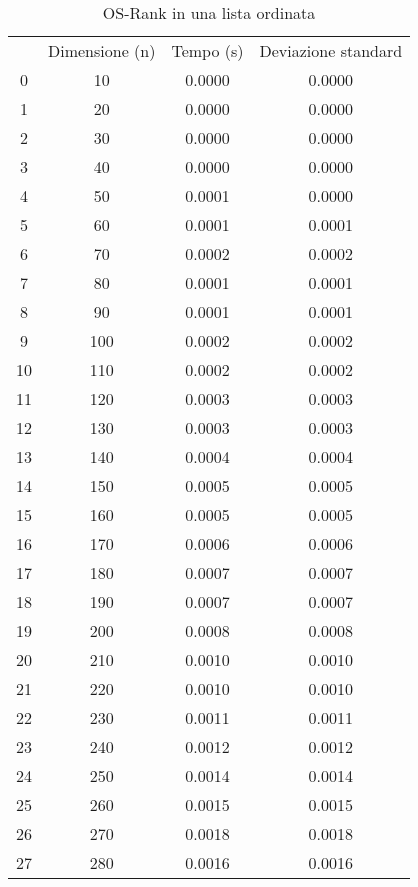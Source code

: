 \begin{table}
\centering
\caption{OS-Rank in una lista ordinata}
\label{OS-Rank in una lista ordinata}
\begin{adjustbox}{width=1\textwidth/2}
\begin{tabular}{|c|c|c|c|}
\hline
 & Dimensione (n) & Tempo (s) & Deviazione standard \\
0 & 10 & 0.0000 & 0.0000 \\
\cline{1-4}
1 & 20 & 0.0000 & 0.0000 \\
\cline{1-4}
2 & 30 & 0.0000 & 0.0000 \\
\cline{1-4}
3 & 40 & 0.0000 & 0.0000 \\
\cline{1-4}
4 & 50 & 0.0001 & 0.0000 \\
\cline{1-4}
5 & 60 & 0.0001 & 0.0001 \\
\cline{1-4}
6 & 70 & 0.0002 & 0.0002 \\
\cline{1-4}
7 & 80 & 0.0001 & 0.0001 \\
\cline{1-4}
8 & 90 & 0.0001 & 0.0001 \\
\cline{1-4}
9 & 100 & 0.0002 & 0.0002 \\
\cline{1-4}
10 & 110 & 0.0002 & 0.0002 \\
\cline{1-4}
11 & 120 & 0.0003 & 0.0003 \\
\cline{1-4}
12 & 130 & 0.0003 & 0.0003 \\
\cline{1-4}
13 & 140 & 0.0004 & 0.0004 \\
\cline{1-4}
14 & 150 & 0.0005 & 0.0005 \\
\cline{1-4}
15 & 160 & 0.0005 & 0.0005 \\
\cline{1-4}
16 & 170 & 0.0006 & 0.0006 \\
\cline{1-4}
17 & 180 & 0.0007 & 0.0007 \\
\cline{1-4}
18 & 190 & 0.0007 & 0.0007 \\
\cline{1-4}
19 & 200 & 0.0008 & 0.0008 \\
\cline{1-4}
20 & 210 & 0.0010 & 0.0010 \\
\cline{1-4}
21 & 220 & 0.0010 & 0.0010 \\
\cline{1-4}
22 & 230 & 0.0011 & 0.0011 \\
\cline{1-4}
23 & 240 & 0.0012 & 0.0012 \\
\cline{1-4}
24 & 250 & 0.0014 & 0.0014 \\
\cline{1-4}
25 & 260 & 0.0015 & 0.0015 \\
\cline{1-4}
26 & 270 & 0.0018 & 0.0018 \\
\cline{1-4}
27 & 280 & 0.0016 & 0.0016 \\

\end{tabular}
\end{adjustbox}
\end{table}
